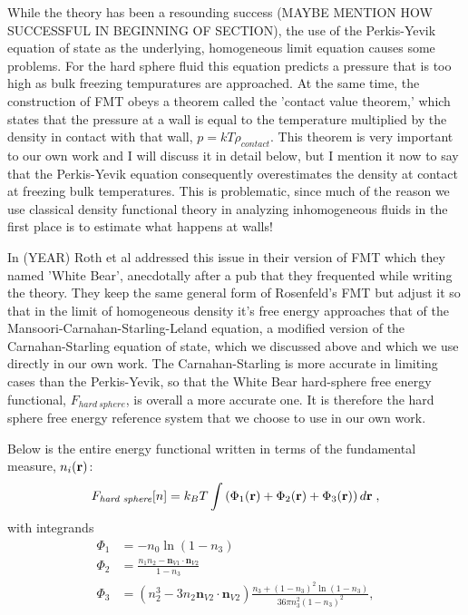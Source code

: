 While the theory has been a resounding success (MAYBE MENTION HOW SUCCESSFUL IN BEGINNING OF SECTION), the use of the Perkis-Yevik equation of state as the underlying, homogeneous limit equation causes some problems.  For the hard sphere fluid this equation predicts a pressure that is too high as bulk freezing tempuratures are approached.  At the same time, the construction of FMT obeys a theorem called the 'contact value theorem,' which states that the pressure at a wall is equal to the temperature multiplied by the density in contact with that wall, $p=kT\rho_{contact}$.  This theorem is very important to our own work and I will discuss it in detail below, but I mention it now to say that the Perkis-Yevik equation consequently overestimates the density at contact at  freezing bulk temperatures.  This is problematic, since much of the reason we use classical density functional theory in analyzing inhomogeneous fluids in the first place is to estimate what happens at walls! 

In (YEAR) Roth et al addressed this issue in their version of FMT which they named 'White Bear', anecdotally after a pub that they frequented while writing the theory.  They keep the same general form of Rosenfeld's FMT but adjust it so that in the limit of homogeneous density it's free energy approaches that of the Mansoori-Carnahan-Starling-Leland equation, a modified version of the Carnahan-Starling equation of state, which we discussed above and which we use directly in our own work.  The Carnahan-Starling is more accurate in limiting cases than the Perkis-Yevik, so that the White Bear hard-sphere free energy functional, $F_{hard~sphere}$, is overall a more accurate one.  It is therefore the hard sphere free energy reference system that we choose to use in our own work.   

Below is the entire energy functional written in terms of the fundamental measure, $n_i(\textbf{r})$:
\begin{equation}
F_\textit{hard~sphere}[n] = k_B T \int \left(\Phi_1(\textbf{r}) + \Phi_2(\textbf{r}) + \Phi_3(\textbf{r})\right) d\textbf{r} \; ,
\end{equation}
with integrands
\begin{align}
\Phi_1 &= -n_0 \ln\left( 1 - n_3\right) \label{eq:Phi1}\\
\Phi_2 &= \frac{n_1 n_2 - \mathbf{n}_{V1} \cdot\mathbf{n}_{V2}}{1-n_3} \\
\Phi_3 &= (n_2^3 - 3 n_2 \mathbf{n}_{V2} \cdot \mathbf{n}_{V2}) \frac{
  n_3 + (1-n_3)^2 \ln(1-n_3)
}{
  36\pi n_3^2\left( 1 - n_3 \right)^2
} , \label{eq:Phi3}
\end{align}


